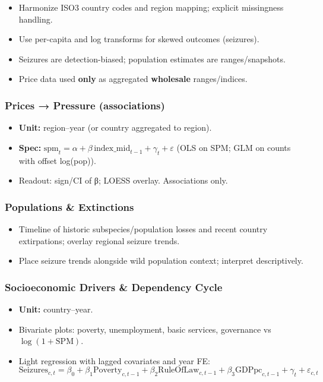 \documentclass[
]{article}
\providecommand{\tightlist}{%
  \setlength{\itemsep}{0pt}\setlength{\parskip}{0pt}}
\begin{document}
\begin{itemize}
\tightlist
\item
  Harmonize ISO3 country codes and region mapping; explicit missingness
  handling.
\item
  Use per-capita and log transforms for skewed outcomes (seizures).
\item
  Seizures are detection-biased; population estimates are
  ranges/snapshots.
\item
  Price data used \textbf{only} as aggregated \textbf{wholesale}
  ranges/indices.
\end{itemize}

\subsubsection{Prices → Pressure
(associations)}\label{prices-pressure-associations}

\begin{itemize}
\tightlist
\item
  \textbf{Unit:} region--year (or country aggregated to region).
\item
  \textbf{Spec:}
  \(\text{spm}_t = \alpha + \beta\,\text{index\_mid}_{t-1} + \gamma_t + \varepsilon\)
  (OLS on SPM; GLM on counts with offset log(pop)).
\item
  Readout: sign/CI of β; LOESS overlay. Associations only.
\end{itemize}

\subsubsection{Populations \&
Extinctions}\label{populations-extinctions}

\begin{itemize}
\tightlist
\item
  Timeline of historic subspecies/population losses and recent country
  extirpations; overlay regional seizure trends.
\item
  Place seizure trends alongside wild population context; interpret
  descriptively.
\end{itemize}

\subsubsection{Socioeconomic Drivers \& Dependency
Cycle}\label{socioeconomic-drivers-dependency-cycle}

\begin{itemize}
\tightlist
\item
  \textbf{Unit:} country--year.
\item
  Bivariate plots: poverty, unemployment, basic services, governance vs
  \(\log(1+\text{SPM})\).
\item
  Light regression with lagged covariates and year FE:
  \(\text{Seizures}_{c,t} = \beta_0 + \beta_1 \text{Poverty}_{c,t-1} + \beta_2 \text{RuleOfLaw}_{c,t-1} + \beta_3 \text{GDPpc}_{c,t-1} + \gamma_t + \varepsilon_{c,t}\)
\end{itemize}
\end{document}
